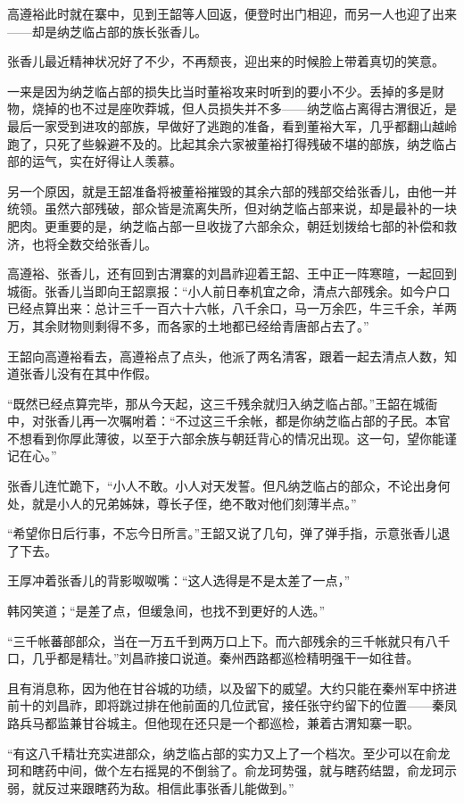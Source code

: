 高遵裕此时就在寨中，见到王韶等人回返，便登时出门相迎，而另一人也迎了出来——却是纳芝临占部的族长张香儿。

张香儿最近精神状况好了不少，不再颓丧，迎出来的时候脸上带着真切的笑意。

一来是因为纳芝临占部的损失比当时董裕攻来时听到的要小不少。丢掉的多是财物，烧掉的也不过是座吹莽城，但人员损失并不多——纳芝临占离得古渭很近，是最后一家受到进攻的部族，早做好了逃跑的准备，看到董裕大军，几乎都翻山越岭跑了，只死了些躲避不及的。比起其余六家被董裕打得残破不堪的部族，纳芝临占部的运气，实在好得让人羡慕。

另一个原因，就是王韶准备将被董裕摧毁的其余六部的残部交给张香儿，由他一并统领。虽然六部残破，部众皆是流离失所，但对纳芝临占部来说，却是最补的一块肥肉。更重要的是，纳芝临占部一旦收拢了六部余众，朝廷划拨给七部的补偿和救济，也将全数交给张香儿。

高遵裕、张香儿，还有回到古渭寨的刘昌祚迎着王韶、王中正一阵寒暄，一起回到城衙。张香儿当即向王韶禀报：“小人前日奉机宜之命，清点六部残余。如今户口已经点算出来：总计三千一百六十六帐，八千余口，马一万余匹，牛三千余，羊两万，其余财物则剩得不多，而各家的土地都已经给青唐部占去了。”

王韶向高遵裕看去，高遵裕点了点头，他派了两名清客，跟着一起去清点人数，知道张香儿没有在其中作假。

“既然已经点算完毕，那从今天起，这三千残余就归入纳芝临占部。”王韶在城衙中，对张香儿再一次嘱咐着：“不过这三千余帐，都是你纳芝临占部的子民。本官不想看到你厚此薄彼，以至于六部余族与朝廷背心的情况出现。这一句，望你能谨记在心。”

张香儿连忙跪下，“小人不敢。小人对天发誓。但凡纳芝临占的部众，不论出身何处，就是小人的兄弟姊妹，尊长子侄，绝不敢对他们刻薄半点。”

“希望你日后行事，不忘今日所言。”王韶又说了几句，弹了弹手指，示意张香儿退了下去。

王厚冲着张香儿的背影呶呶嘴：“这人选得是不是太差了一点，”

韩冈笑道；“是差了点，但缓急间，也找不到更好的人选。”

“三千帐蕃部部众，当在一万五千到两万口上下。而六部残余的三千帐就只有八千口，几乎都是精壮。”刘昌祚接口说道。秦州西路都巡检精明强干一如往昔。

且有消息称，因为他在甘谷城的功绩，以及留下的威望。大约只能在秦州军中挤进前十的刘昌祚，即将跳过排在他前面的几位武官，接任张守约留下的位置——秦凤路兵马都监兼甘谷城主。但他现在还只是一个都巡检，兼着古渭知寨一职。

“有这八千精壮充实进部众，纳芝临占部的实力又上了一个档次。至少可以在俞龙珂和瞎药中间，做个左右摇晃的不倒翁了。俞龙珂势强，就与瞎药结盟，俞龙珂示弱，就反过来跟瞎药为敌。相信此事张香儿能做到。”

